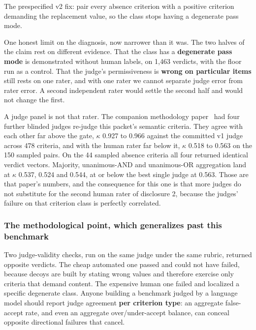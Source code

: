 \documentclass[11pt]{article}
\begin{document}
The prespecified v2 fix: pair every absence criterion with a positive criterion
demanding the replacement value, so the class stops having a degenerate pass
mode.

One honest limit on the diagnosis, now narrower than it was. The two halves of
the claim rest on different evidence. That the class has a \textbf{degenerate
pass mode} is demonstrated without human labels, on 1{,}463 verdicts, with the
floor run as a control. That the judge's permissiveness is \textbf{wrong on
particular items} still rests on one rater, and with one rater we cannot separate
judge error from rater error. A second independent rater would settle the second
half and would not change the first.

A judge panel is not that rater. The companion methodology
paper~\cite{pipeline} had four further blinded judges re-judge this packet's
semantic criteria. They agree with each other far above the gate, $\kappa$ 0.927
to 0.966 against the committed v1 judge across 478 criteria, and with the human
rater far below it, $\kappa$ 0.518 to 0.563 on the 150 sampled pairs. On the 44
sampled absence criteria all four returned identical verdict vectors. Majority,
unanimous-AND and unanimous-OR aggregation land at $\kappa$ 0.537, 0.524 and
0.544, at or below the best single judge at 0.563. Those are that paper's
numbers, and the consequence for this one is that more judges do not substitute
for the second human rater of disclosure 2, because the judges' failure on that
criterion class is perfectly correlated.

\subsubsection*{The methodological point, which generalizes past this benchmark}

Two judge-validity checks, run on the same judge under the same rubric, returned
opposite verdicts. The cheap automated one passed and could not have failed,
because decoys are built by stating wrong values and therefore exercise only
criteria that demand content. The expensive human one failed and localized a
specific degenerate class. Anyone building a benchmark judged by a language model
should report judge agreement \textbf{per criterion type}: an aggregate
false-accept rate, and even an aggregate over/under-accept balance, can conceal
opposite directional failures that cancel.
\end{document}
